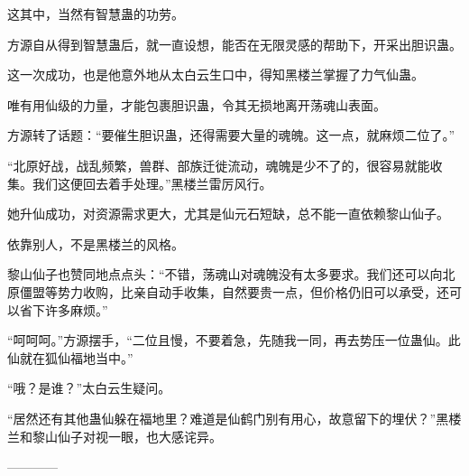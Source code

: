 \begin{this_body}
这其中，当然有智慧蛊的功劳。

方源自从得到智慧蛊后，就一直设想，能否在无限灵感的帮助下，开采出胆识蛊。

这一次成功，也是他意外地从太白云生口中，得知黑楼兰掌握了力气仙蛊。

唯有用仙级的力量，才能包裹胆识蛊，令其无损地离开荡魂山表面。

方源转了话题：“要催生胆识蛊，还得需要大量的魂魄。这一点，就麻烦二位了。”

“北原好战，战乱频繁，兽群、部族迁徙流动，魂魄是少不了的，很容易就能收集。我们这便回去着手处理。”黑楼兰雷厉风行。

她升仙成功，对资源需求更大，尤其是仙元石短缺，总不能一直依赖黎山仙子。

依靠别人，不是黑楼兰的风格。

黎山仙子也赞同地点点头：“不错，荡魂山对魂魄没有太多要求。我们还可以向北原僵盟等势力收购，比亲自动手收集，自然要贵一点，但价格仍旧可以承受，还可以省下许多麻烦。”

“呵呵呵。”方源摆手，“二位且慢，不要着急，先随我一同，再去势压一位蛊仙。此仙就在狐仙福地当中。”

“哦？是谁？”太白云生疑问。

“居然还有其他蛊仙躲在福地里？难道是仙鹤门别有用心，故意留下的埋伏？”黑楼兰和黎山仙子对视一眼，也大感诧异。

------------

\end{this_body}

